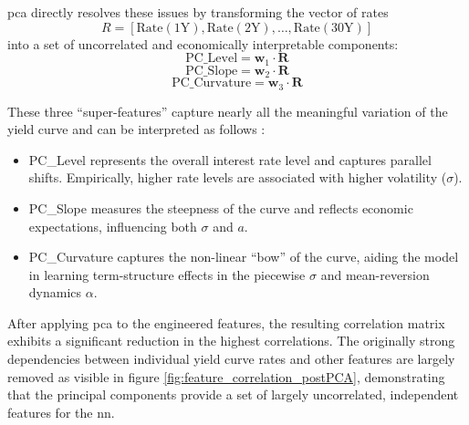 \ac{pca} directly resolves these issues by transforming the vector of rates
\[
	R = [\text{Rate}(1\text{Y}), \text{Rate}(2\text{Y}), \dots, \text{Rate}(30\text{Y})]
\]
into a set of uncorrelated and economically interpretable components:
\begin{equation}
	\text{PC\_Level} = \mathbf{w}_1 \cdot \mathbf{R}
\end{equation}
\begin{equation}
	\text{PC\_Slope} = \mathbf{w}_2 \cdot \mathbf{R}
\end{equation}
\begin{equation}
	\text{PC\_Curvature} = \mathbf{w}_3 \cdot \mathbf{R}
\end{equation}

These three “super-features” capture nearly all the meaningful variation of the yield curve and can be interpreted as follows \parencite[pp.~98--107]{Rebonato_2018}:
\begin{itemize}
	\item PC\_Level represents the overall interest rate level and captures parallel shifts. Empirically, higher rate levels are associated with higher volatility (\(\sigma\)).
	\item PC\_Slope measures the steepness of the curve and reflects economic expectations, influencing both \(\sigma\) and \(a\).
	\item PC\_Curvature captures the non-linear “bow” of the curve, aiding the model in learning term-structure effects in the piecewise $\sigma$ and mean-reversion dynamics $\alpha$.
\end{itemize}

After applying \ac{pca} to the engineered features, the resulting correlation matrix exhibits a significant reduction in the highest correlations. The originally strong dependencies between individual yield curve rates and other features are largely removed as visible in figure \ref{fig:feature_correlation_postPCA}, demonstrating that the principal components provide a set of largely uncorrelated, independent features for the \ac{nn}.

